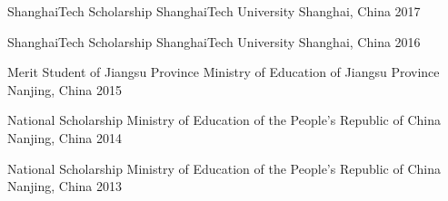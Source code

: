




\begin{cvhonors}


\cvhonor
{ShanghaiTech Scholarship}
{ShanghaiTech University}
{Shanghai, China}
{2017}

\cvhonor
{ShanghaiTech Scholarship}
{ShanghaiTech University}
{Shanghai, China}
{2016}

\cvhonor
{Merit Student of Jiangsu Province} %
{Ministry of Education of Jiangsu Province} %
{Nanjing, China} %
{2015} %

\cvhonor
{National Scholarship}
{Ministry of Education of the People's Republic of China}  %
{Nanjing, China} %
{2014} %

\cvhonor
{National Scholarship}
{Ministry of Education of the People's Republic of China}  %
{Nanjing, China} %
{2013} %








\end{cvhonors}




